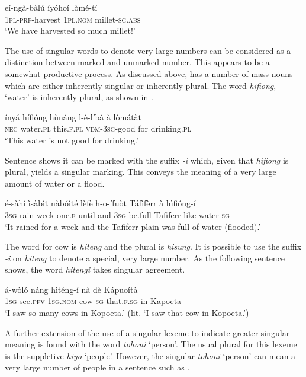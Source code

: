 \documentclass[output=paper]{langsci/langscibook}
\begin{document}
\ea\label{ex:moodie:10}
\gll eí-ngà-bàlú íyóhoí lòmé-tí \\
1\textsc{pl-prf}-harvest 1\textsc{pl.nom} millet-\textsc{sg.abs} \\
\glt ‘We have harvested so much millet!’
\z

The use of singular words to denote very large numbers can be considered as a distinction between marked and unmarked number. This appears to be a somewhat productive process. As discussed above,  has a number of mass nouns which are either inherently singular or inherently plural. The word \textit{hifiong}, ‘water’ is inherently plural, as shown in .

\ea\label{ex:moodie:11}
\gll ínyá hífióng hùnáng l-è-líbà à lòmátàt \\
\textsc{neg} water.\textsc{pl} this.\textsc{f.pl} \textsc{vdm-3sg}-good for drinking.\textsc{pl} \\
\glt ‘This water is not good for drinking.’
\z

Sentence  shows it can be marked with the suffix \textit{-i} which, given that \textit{hifiong} is plural, yields a singular marking. This conveys the meaning of a very large amount of water or a flood.

\ea\label{ex:moodie:12}
\gll é-sàhí ìsàbìt nàbóìté lèfè h-o-ífuòt Táfìfèrr à hìfióng-í \\
\textsc{3sg}-rain week one.\textsc{f} until and-3\textsc{sg}-be.full Tafiferr like water-\textsc{sg} \\
\glt ‘It rained for a week and the Tafiferr plain was full of water (flooded).’ 
\z

The word for cow is \textit{hiteng} and the plural is \textit{hisung}. It is possible to use the suffix \textit{-i} on \textit{hiteng} to denote a special, very large number. As the following sentence shows, the word \textit{hitengi} takes singular agreement.

\ea\label{ex:moodie:13}
\gll á-wòló náng hìténg-í nà dè Kápuoítà \\
1\textsc{sg}-see.\textsc{pfv} 1\textsc{sg.nom} cow-\textsc{sg} that.\textsc{f.sg} in Kapoeta \\
\glt ‘I saw so many cows in Kopoeta.’ (lit. ‘I saw that cow in Kopoeta.’)
\z

A further extension of the use of a singular lexeme to indicate greater singular meaning is found with the word \textit{tohoni} ‘person’. The usual plural for this lexeme is the suppletive \textit{hiyo} ‘people’. However, the singular \textit{tohoni} ‘person’ can mean a very large number of people in a sentence such as .
\end{document}
